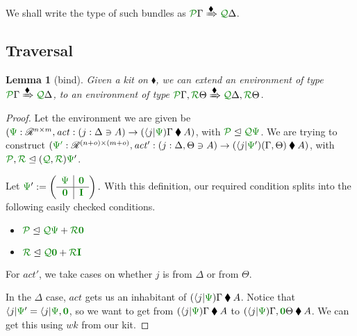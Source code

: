 \documentclass[submission,copyright,creativecommons]{eptcs}
\newtheorem{lemma}[theorem]{Lemma}
\newcommand{\kitrel}{\mathbin{\blacklozenge}}
\begin{document}
We shall write the type of such bundles as
$\ctx{\Gamma}{P} \subst{\kitrel} \ctx{\Delta}{Q}$.

\subsection{Traversal}

\begin{lemma}[bind]\label{lem:bind}
  Given a kit on $\kitrel$, we can extend an environment of type
  $\ctx{\Gamma}{P} \subst{\kitrel} \ctx{\Delta}{Q}$, to an environment of type
  $\ctx{\Gamma}{P}, \ctx{\Theta}{R} \subst{\kitrel}
  \ctx{\Delta}{Q}, \ctx{\Theta}{R}$.
\end{lemma}
\begin{proof}
  Let the environment we are given be
  $(\rescomment\Psi : \mathscr R^{n \times m},
  \mathit{act} : (j : \Delta \ni A) \to (\langle j \rvert\rescomment\Psi)\Gamma \kitrel A)$,
  with $\resctx P \subres \resctx Q \rescomment\Psi$.
  We are trying to construct
  $(\rescomment{\Psi'} : \mathscr R^{(n + o) \times (m + o)},
  \mathit{act'} : (j : \Delta, \Theta \ni A) \to
  (\langle j \rvert\rescomment\Psi')(\Gamma, \Theta) \kitrel A)$,
  with $\resctx P, \resctx R \subres (\resctx Q, \resctx R) \rescomment\Psi'$.

  Let \(
    \rescomment\Psi' := \left(\begin{array}{c|c}
                                \rescomment\Psi & \rescomment{\mat 0}
                                \\ \hline
                                \rescomment{\mat 0} & \rescomment{\mat I}
                              \end{array}\right).
  \)
  With this definition, our required condition splits into the following easily
  checked conditions.
  \begin{itemize}
    \item
      $\resctx P \subres
      \resctx Q\rescomment\Psi + \resctx R\rescomment{\mat 0}$
    \item
      $\resctx R \subres
      \resctx Q\rescomment{\mat 0} + \resctx R\rescomment{\mat I}$
  \end{itemize}

  For $\mathit{act'}$, we take cases on whether $j$ is from $\Delta$ or from
  $\Theta$.

  In the $\Delta$ case, $\mathit{act}$ gets us an inhabitant of
  $(\langle j \rvert\rescomment\Psi)\Gamma \kitrel A$.
  Notice that
  $\langle j \rvert\rescomment\Psi' =
  \langle j \rvert\rescomment\Psi, \rescomment{\vct 0}$,
  so we want to get from $(\langle j \rvert\rescomment\Psi)\Gamma \kitrel A$ to
  $(\langle j \rvert\rescomment\Psi)\Gamma, \rescomment{\vct 0}\Theta
  \kitrel A$.
  We can get this using $\mathit{wk}$ from our kit.


\end{proof}
\end{document}
